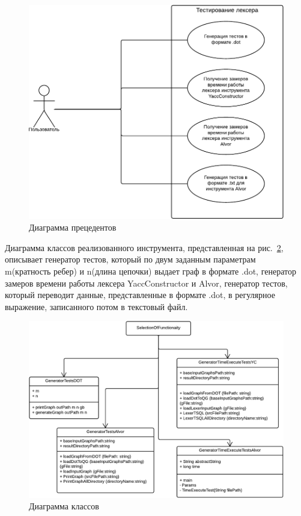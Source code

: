 \begin{figure}[t]
\centering
\includegraphics[width=\textwidth]{Polubelova/dpo}
\caption{Диаграмма прецедентов}
\label{fig:dpo} 
\end{figure}
	
Диаграмма классов реализованного инструмента, представленная на рис.~\ref{fig:dco}, описывает  генератор тестов, который по двум заданным параметрам \\ 
m(кратность ребер) и n(длина цепочки) выдает граф в формате .dot, генератор замеров времени работы лексера YaccConstructor и Alvor, 
генератор тестов, который переводит данные, представленные в формате .dot, в регулярное выражение, записанного потом в текстовый файл. 

\begin{figure}[t]
\centering
\includegraphics[width=\textwidth]{Polubelova/dco}
\caption{Диаграмма классов}
\label{fig:dco} 
\end{figure}

